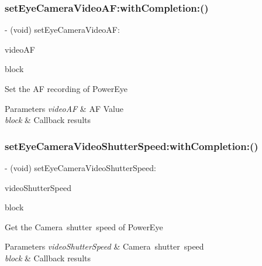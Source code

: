 \subsubsection{\texorpdfstring{set\+Eye\+Camera\+Video\+A\+F\+:with\+Completion\+:()}{setEyeCameraVideoAF:withCompletion:()}}
{\footnotesize\ttfamily -\/ (void) set\+Eye\+Camera\+Video\+A\+F\+: \begin{DoxyParamCaption}\item[{(P\+V\+Eye\+Camera\+Video\+AF)}]{video\+AF }\item[{withCompletion:(P\+V\+Completion\+Block)}]{block }\end{DoxyParamCaption}}

Set the AF recording of Power\+Eye


\begin{DoxyParams}{Parameters}
{\em video\+AF} & AF Value \\
\hline
{\em block} & Callback results \\
\hline
\end{DoxyParams}
\mbox{\label{interface_p_v_eye_camera_a98ebfa406c90eba9ea6b130cf406c37b}} 
\subsubsection{\texorpdfstring{set\+Eye\+Camera\+Video\+Shutter\+Speed\+:with\+Completion\+:()}{setEyeCameraVideoShutterSpeed:withCompletion:()}}
{\footnotesize\ttfamily -\/ (void) set\+Eye\+Camera\+Video\+Shutter\+Speed\+: \begin{DoxyParamCaption}\item[{(P\+V\+Eye\+Camera\+Video\+Shutter\+Speed)}]{video\+Shutter\+Speed }\item[{withCompletion:(P\+V\+Completion\+Block)}]{block }\end{DoxyParamCaption}}

Get the Camera shutter speed of Power\+Eye


\begin{DoxyParams}{Parameters}
{\em video\+Shutter\+Speed} & Camera shutter speed \\
\hline
{\em block} & Callback results \\
\hline
\end{DoxyParams}
\mbox{\label{interface_p_v_eye_camera_abe2afddccc2b07d02cd6b2153b04d3a4}} 
